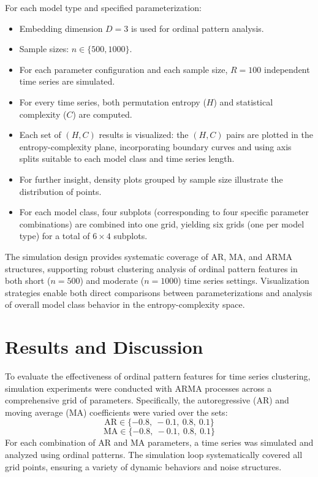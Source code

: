 \documentclass[12pt,a4paper]{article}
\begin{document}
For each model type and specified parameterization:
\begin{itemize}
	\item Embedding dimension $D=3$ is used for ordinal pattern analysis.
	\item Sample sizes: $n \in \{500, 1000\}$.
	\item For each parameter configuration and each sample size, $R=100$ independent time series are simulated.
	\item For every time series, both permutation entropy ($H$) and statistical complexity ($C$) are computed.
	\item Each set of $(H, C)$ results is visualized: the $(H, C)$  pairs are plotted in the entropy-complexity plane, incorporating boundary curves and using axis splits suitable to each model class and time series length.
	\item For further insight, density plots grouped by sample size illustrate the distribution of points.
	\item For each model class, four subplots (corresponding to four specific parameter combinations) are combined into one grid, yielding six grids (one per model type) for a total of $6 \times 4$ subplots.
\end{itemize}

The simulation design provides systematic coverage of AR, MA, and ARMA structures, supporting robust clustering analysis of ordinal pattern features in both short ($n=500$) and moderate ($n=1000$) time series settings. Visualization strategies enable both direct comparisons between parameterizations and analysis of overall model class behavior in the entropy-complexity space.

\section{Results and Discussion}

To evaluate the effectiveness of ordinal pattern features for time series clustering, simulation experiments were conducted with ARMA processes across a comprehensive grid of parameters. Specifically, the autoregressive (AR) and moving average (MA) coefficients were varied over the sets:
\[
\text{AR} \in \{-0.8,\ -0.1,\ 0.8,\ 0.1 \}
\]
\[
\text{MA} \in \{-0.8,\ -0.1,\ 0.8,\ 0.1 \}
\]
For each combination of AR and MA parameters, a time series was simulated and analyzed using ordinal patterns. The simulation loop systematically covered all grid points, ensuring a variety of dynamic behaviors and noise structures.
\end{document}
